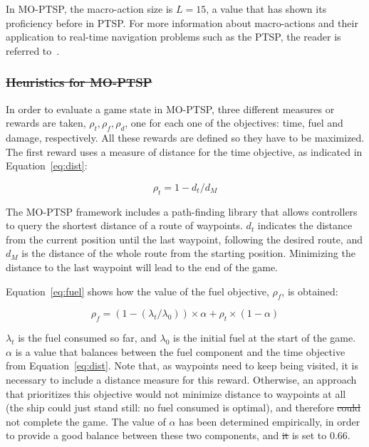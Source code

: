 \documentclass[journal]{IEEEtran}
\providecommand{\DIFaddtex}[1]{{\protect\color{blue}\uwave{#1}}} %
\providecommand{\DIFdeltex}[1]{{\protect\color{red}\sout{#1}}}                      %
\providecommand{\DIFaddbegin}{} %
\providecommand{\DIFaddend}{} %
\providecommand{\DIFdelbegin}{} %
\providecommand{\DIFdelend}{} %
\providecommand{\DIFadd}[1]{\texorpdfstring{\DIFaddtex{#1}}{#1}} %
\providecommand{\DIFdel}[1]{\texorpdfstring{\DIFdeltex{#1}}{}} %
\begin{document}
In MO-PTSP, the macro-action size is $L = 15$, a value that has shown its proficiency before in PTSP. For more information about macro-actions and their application to real-time navigation problems such as the PTSP, the reader is referred to~\cite{Perez2013}.

\DIFdelbegin \subsubsection{\DIFdel{Heuristics for MO-PTSP}} %
\addtocounter{subsubsection}{-1}%

\DIFdelend In order to evaluate a game state in MO-PTSP, three different measures or rewards are taken, $\rho_t, \rho_f, \rho_d$, one for each one of the objectives: time, fuel and damage, respectively. All these rewards are defined so they have to be maximized. The first reward uses a measure of distance for the time objective, as indicated in Equation~\ref{eq:dist}: 

\begin{equation}	\label{eq:dist}
\rho_t = 1 - d_t/d_M
\end{equation}

The MO-PTSP framework includes a path-finding library that allows controllers to query the shortest distance of a route of waypoints. $d_t$ indicates the distance from the current position until the last waypoint, following the desired route, and $d_M$ is the distance of the whole route from the starting position. Minimizing the distance to the last waypoint will lead to the end of the game.

Equation~\ref{eq:fuel} shows how the value of the fuel objective, $\rho_f$, is obtained:


\begin{equation}	\label{eq:fuel}
\rho_f = (1 - (\lambda_t/\lambda_0)) \times \alpha + \rho_t \times (1 - \alpha)
\end{equation}

$\lambda_t$ is the fuel consumed so far, and $\lambda_0$ is the initial fuel at the start of the game. $\alpha$ is a value that balances between the fuel component and the time objective from Equation~\ref{eq:dist}. Note that, as waypoints need to keep being visited, it is necessary to include a distance measure for this reward. Otherwise, an approach that prioritizes this objective would not minimize distance to waypoints at all (the ship could just stand still: no fuel consumed is optimal), and therefore \DIFdelbegin \DIFdel{could }\DIFdelend \DIFaddbegin \DIFadd{would }\DIFaddend not complete the game. The value of $\alpha$ has been determined empirically, in order to provide a good balance between these two components, and \DIFdelbegin \DIFdel{it }\DIFdelend is set to $0.66$.
\end{document}
